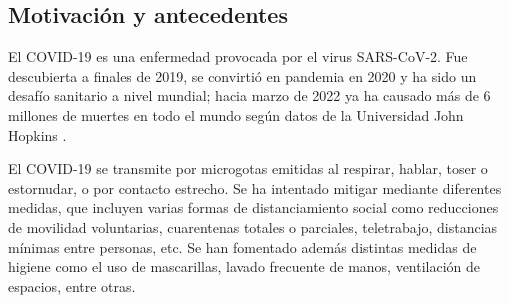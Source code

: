 \begin{intro}





\section*{Motivación y antecedentes}

El COVID-19 es una enfermedad provocada por el virus SARS-CoV-2. Fue descubierta a finales de 2019, se convirtió en pandemia en 2020 y ha sido un desafío sanitario a nivel mundial; hacia marzo de 2022 ya ha causado más de 6 millones de muertes en todo el mundo según datos de la Universidad John Hopkins \cite{}. %

El COVID-19 se transmite por microgotas emitidas al respirar, hablar, toser o estornudar, o por contacto estrecho. Se ha intentado mitigar mediante diferentes medidas, que incluyen varias formas de distanciamiento social como reducciones de movilidad voluntarias, cuarentenas totales o parciales, teletrabajo, distancias mínimas entre personas, etc. Se han fomentado además distintas medidas de higiene como el uso de mascarillas, lavado frecuente de manos, ventilación de espacios, entre otras.


\end{intro}
